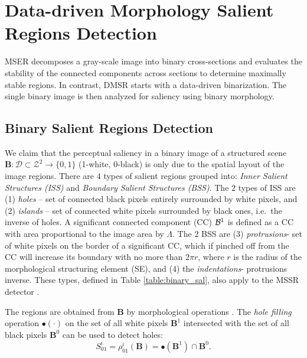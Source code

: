 \documentclass[conference,compsoc]{IEEEtran}
\newcommand {\be}{\begin{equation}}
\newcommand {\ee}{\end{equation}}
\def\B{{\mathbf B}}
\def\mcD{{\mathcal{D}}}
\begin{document}
\section{Data-driven Morphology Salient Regions Detection}
\label{sec:DMSR}


MSER decomposes a gray-scale image into binary cross-sections and evaluates the stability of the connected components across sections to determine maximally stable regions. In contrast, DMSR starts with a data-driven binarization. The single binary image is then analyzed for saliency using binary morphology. %

\subsection{Binary Salient Regions Detection}
\label{ssec:binary}
We claim that the perceptual saliency in a binary image of a structured scene 
 $\B: \mcD \subset \mathcal{Z}^2 \rightarrow \{0,1\}$ (1-white, 0-black)
is only due to the spatial layout of the image regions. 
There are $4$ types of salient regions grouped into: {\em Inner Salient Structures (ISS)} and {\em Boundary Salient Structures (BSS)}. The $2$ types of ISS are (1) {\em holes} -- set of connected black pixels entirely surrounded by white pixels, and (2) {\em islands} -- set of connected white pixels surrounded by black ones, i.e.~the inverse of holes. A significant connected component (CC) ${\cal B}^1$ is defined as a CC with area proportional to the image area by $\Lambda$.
The $2$ BSS are (3) {\em protrusions}- set of white pixels on the border of a significant CC, which if pinched off from the CC will increase its boundary with no more than $2\pi r$, where $r$ is the radius of the morphological structuring element (SE), and (4) the {\em indentations}- protrusions inverse. 
These types, defined in Table \ref{table:binary_sal}, also apply to the MSSR detector \cite{RangHumpb06}. 

The regions are obtained from $\B$ by morphological operations \cite{Soille}. 
The {\em hole filling} operation $\bullet (\cdot)$ on the set of all white pixels $\B ^1$ intersected with the set of all black pixels $\B^0$ can be used to detect holes:
\be
S^i_{01} = \rho^i_{01}(\B)= \bullet(\B ^1) \cap \B^0 \label{eqn:sal:inn:01}.
\ee
\end{document}
